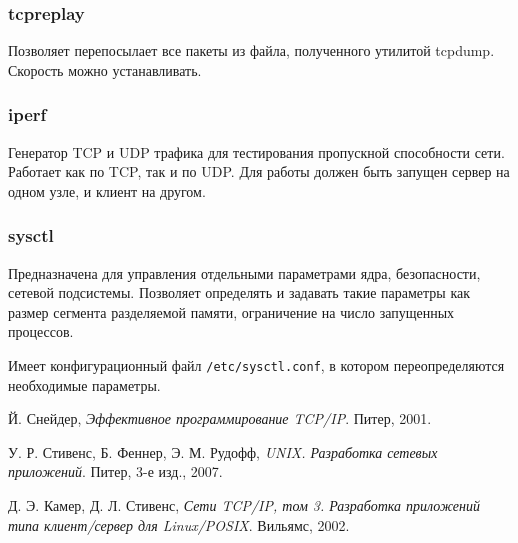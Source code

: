 \subsubsection{tcpreplay}
Позволяет перепосылает все пакеты из файла, полученного утилитой tcpdump. Скорость можно устанавливать.

\subsubsection{iperf}
Генератор TCP и UDP трафика для тестирования пропускной способности сети. Работает как по TCP, так и по UDP. Для работы должен быть запущен сервер на одном узле, и клиент на другом.

\subsubsection{sysctl}
Предназначена для управления отдельными параметрами ядра, безопасности, сетевой подсистемы. Позволяет определять и задавать такие параметры как размер сегмента разделяемой памяти, ограничение на число запущенных процессов.

Имеет конфигурационный файл \texttt{/etc/sysctl.conf}, в котором переопределяются необходимые параметры.

\begin{thebibliography}{9}

  Й. Снейдер,
  \emph{Эффективное программирование TCP/IP}.
  Питер,
  2001.

  У. Р. Стивенс, Б. Феннер, Э. М. Рудофф,
  \emph{UNIX. Разработка сетевых приложений}.
  Питер,
  3-е изд.,
  2007.

  Д. Э. Камер, Д. Л. Стивенс,
  \emph{Сети TCP/IP, том 3. Разработка приложений типа клиент/сервер для Linux/POSIX}.
  Вильямс,
  2002.

\end{thebibliography}
